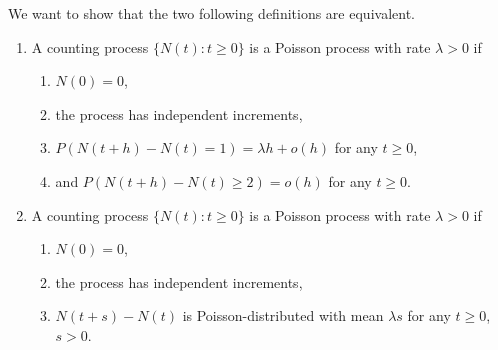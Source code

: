 \documentclass{homework}
\begin{document}
	\question We want to show that the two following definitions are equivalent.
	\begin{enumerate}
		\item A counting process $\{N(t) : t \ge 0\}$ is a Poisson process with rate $\lambda > 0$ if
		\begin{enumerate}
			\item $N(0) = 0$,
			\item the process has independent increments,
			\item $P(N(t+h) - N(t)=1) = \lambda h + o(h)$ for any $t \ge 0$,
			\item and $P(N(t+h) - N(t)\ge 2) = o(h)$ for any $t \ge 0$.
		\end{enumerate}
		\item A counting process $\{N(t) : t \ge 0\}$ is a Poisson process with rate $\lambda > 0$ if
		\begin{enumerate}
			\item $N(0) = 0$,
			\item the process has independent increments,
			\item $N(t+s) - N(t)$ is Poisson-distributed with mean $\lambda s$ for any $t \ge 0$, $s > 0$.
		\end{enumerate}
	\end{enumerate}
\end{document}
